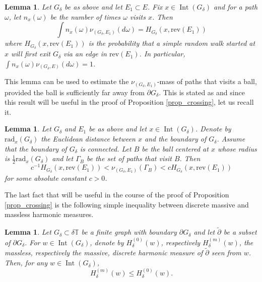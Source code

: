 \documentclass{article}
\newtheorem{lemma}[theorem]{Lemma}
\theoremstyle{definition}
\theoremstyle{remark}
\theoremstyle{remark}
\begin{document}
\begin{lemma} \label{lemma_visits}
Let $G_{\delta}$ be as above and let $E_1 \subset E$. Fix $x \in \operatorname{Int}(G_{\delta})$ and for a path $\omega$, let $n_x(\omega)$ be the number of times $\omega$ visits $x$. Then
\begin{equation*}
    \int n_x(\omega) \nu_{(G_{\delta},E_1)}(d\omega) = H_{G_{\delta}}(x,\text{rev}(E_1))
\end{equation*}
where $H_{G_{\delta}}(x, \text{rev}(E_1))$ is the probability that a simple random walk started at $x$ will first exit $G_{\delta}$ via an edge in $\text{rev}(E_1)$. In particular, $\int n_x(\omega) \nu_{(G_{\delta},E)}(d\omega) = 1$.
\end{lemma}

This lemma can be used to estimate the $\nu_{(G_{\delta}, E_1)}$-mass of paths that visits a ball, provided the ball is sufficiently far away from $\partial G_{\delta}$. This is stated as \cite[Corollary~6.2]{HE} and since this result will be useful in the proof of Proposition \ref{prop_crossing}, let us recall it.

\begin{lemma} \label{lemma_massball}
Let $G_{\delta}$ and $E_1$ be as above and let $x \in \operatorname{Int}(G_{\delta})$. Denote by $\text{rad}_x(G_{\delta})$ the Euclidean distance between $x$ and the boundary of $G_{\delta}$. Assume that the boundary of $G_{\delta}$ is connected. Let $B$ be the ball centered at $x$ whose radius is $\frac{1}{2}\text{rad}_x(G_{\delta})$ and let $\Gamma_B$ be the set of paths that visit $B$. Then
\begin{equation*}
    c^{-1}H_{G_{\delta}}(x, \text{rev}(E_1)) < \nu_{(G_{\delta},E_1)}(\Gamma_B)< c H_{G_{\delta}}(x, \text{rev}(E_1))
\end{equation*}
for some absolute constant $c>0$.
\end{lemma}

The last fact that will be useful in the course of the proof of Proposition \ref{prop_crossing} is the following simple inequality between discrete massive and massless harmonic measures.

\begin{lemma} \label{lemma_mHmeasure}
    Let $G_{\delta} \subset \delta\mathbb{T}$ be a finite graph with boundary $\partial G_{\delta}$ and let $\tilde \partial$ be a subset of $\partial G_{\delta}$. For $w \in \operatorname{Int}(G_{\delta})$, denote by $H_{\delta}^{(0)}(w)$, respectively $H_{\delta}^{(m)}(w)$, the massless, respectively the massive, discrete harmonic measure of $\tilde \partial$ seen from $w$. Then, for any $w \in \operatorname{Int}(G_{\delta})$,
    \begin{equation*}
        H_{\delta}^{(m)}(w) \leq H_{\delta}^{(0)}(w).
    \end{equation*}
\end{lemma}
\end{document}
